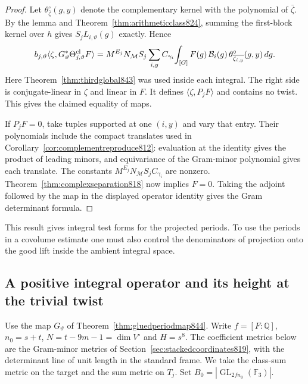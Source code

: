 \documentclass[a4paper,11pt]{article}
\theoremstyle{definition}
\theoremstyle{remark}
\numberwithin{equation}{section}
\begin{document}
\begin{proof}
Let \(\theta^\circ_{\bar\zeta}(g,y)\) denote the complementary kernel
with the polynomial of \(\bar\zeta\). By the lemma and
Theorem~\ref{thm:arithmeticclass824}, summing the first-block kernel
over \(h\) gives \(S_j L_{i,\vartheta}(g)\) exactly. Hence
\[
 \begin{split}
 b_{j,\vartheta}\langle\zeta,
           G_\vartheta^*\Theta_{j,\vartheta}^{\rm cl}F\rangle
  =M^{E_j}N_{\mathcal M}S_j
     \sum_{i,y} C_{\gamma_i}\!
       \int_{[G]} F(g)\,\mathcal B_i(g)\,
                  \theta^\circ_{\overline{\zeta_{i,y}}}(g,y)\,dg .
 \end{split}
\]
Here Theorem~\ref{thm:thirdglobal843} was used inside each integral.
The right side is conjugate-linear in \(\zeta\) and linear in \(F\).
It defines \(\langle\zeta,P_jF\rangle\) and contains no twist.
This gives the claimed equality of maps.

If \(P_jF=0\), take tuples supported at one \((i,y)\) and vary that
entry. Their polynomials include the compact translates used in
Corollary~\ref{cor:complementreproduce812}: evaluation at the
identity gives the product of leading minors, and equivariance of
the Gram-minor polynomial gives each translate. The constants
\(M^{E_j}N_{\mathcal M}S_j C_{\gamma_i}\) are nonzero.
Theorem~\ref{thm:complexseparation818} now implies \(F=0\).
Taking the adjoint followed by the map in the displayed operator
identity gives the Gram determinant formula.
\end{proof}

This result gives integral test forms for the projected periods.
To use the periods in a covolume estimate one must also control
the denominators of projection onto the good lift inside the
ambient integral space.
\clearpage

\subsection{A positive integral operator and its height at the trivial twist}
\label{sec:integralcomparison845}
Use the map \(G_\vartheta\) of Theorem~\ref{thm:gluedperiodmap844}.
Write \(f=[F:\mathbb Q]\), \(n_0=s+t\), \(N=t-9m-1=\dim V^\circ\)
and \(H=s^8\). The coefficient metrics below are the Gram-minor
metrics of Section~\ref{sec:stackedcoordinates819}, with the
determinant line of unit length in the standard frame. We take the
class-sum metric on the target and the sum metric on \(T_j\).
Set \(B_0=|\operatorname{GL}_{2fn_0}(\mathbb F_3)|\).
\end{document}
